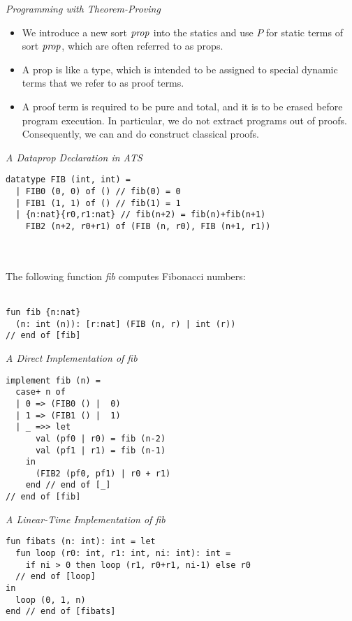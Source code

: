 \documentclass[pdf]{prosper}
\begin{document}
\begin{slide}{\em Programming with Theorem-Proving}
\begin{itemize}
\item
We introduce a new sort ${\it prop}$ into the statics and use $P$ for static
terms of sort ${\it prop}$, which are often referred to as props.
\item
A prop is like a type, which is intended to be assigned to special dynamic
terms that we refer to as proof terms.
\item
A proof term is required to be pure and total, and it is to be erased
before program execution. In particular, we do not extract programs out of
proofs. Consequently, we can and do construct classical proofs.
\end{itemize}
\end{slide}
\begin{slide}{\em A Dataprop Declaration in ATS}
{\blue\begin{verbatim}
datatype FIB (int, int) =
  | FIB0 (0, 0) of () // fib(0) = 0
  | FIB1 (1, 1) of () // fib(1) = 1
  | {n:nat}{r0,r1:nat} // fib(n+2) = fib(n)+fib(n+1)
    FIB2 (n+2, r0+r1) of (FIB (n, r0), FIB (n+1, r1))
\end{verbatim}
}~\\~\\
The following function {\it fib} computes Fibonacci numbers:\\~\\
{\blue\begin{verbatim}
fun fib {n:nat}
  (n: int (n)): [r:nat] (FIB (n, r) | int (r))
// end of [fib]
\end{verbatim}
}
\vfill
\end{slide}
\begin{slide}{\em A Direct Implementation of {\it fib}}
{\blue\begin{verbatim}
implement fib (n) =
  case+ n of
  | 0 => (FIB0 () |  0)
  | 1 => (FIB1 () |  1)
  | _ =>> let
      val (pf0 | r0) = fib (n-2)
      val (pf1 | r1) = fib (n-1)
    in
      (FIB2 (pf0, pf1) | r0 + r1)
    end // end of [_]
// end of [fib]
\end{verbatim}
}
\end{slide}
\begin{slide}{\em A Linear-Time Implementation of {\it fib}}
{
\blue\begin{verbatim}
fun fibats (n: int): int = let
  fun loop (r0: int, r1: int, ni: int): int =
    if ni > 0 then loop (r1, r0+r1, ni-1) else r0
  // end of [loop]
in
  loop (0, 1, n)
end // end of [fibats]
\end{verbatim}
}
\end{slide}
\end{document}
